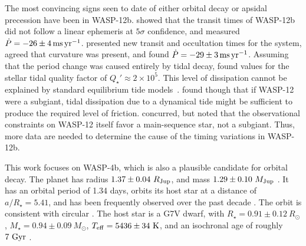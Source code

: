 \documentclass[12pt,twocolumn,tighten]{aastex62}
\begin{document}
The most convincing signs seen to date of either orbital decay or apsidal
precession have been in WASP-12b.
\citet{maciejewski_departure_2016} showed that the transit times of
WASP-12b did not follow a linear ephemeris at $5\sigma$ confidence,
and measured $\dot{P} = -26 \pm 4\,{\rm ms}\,{\rm yr}^{-1}$.
\citet{patra_2017} presented new transit and occultation times for
the system, agreed that curvature was present, and found
$\dot{P} = -29 \pm 3\,{\rm ms}\,{\rm yr}^{-1}$.
Assuming that the period change was caused entirely by tidal decay,
\citet{patra_2017} found values for the stellar tidal quality factor
of $Q_\star' \approx 2\times10^5$.  This level of dissipation cannot be
explained by standard equilibrium tide
models~\citep{penev_tidal_2011,ogilvie_tidal_2014}.
\citet{weinberg_tidal_2017} found though that if WASP-12 were a
subgiant, tidal dissipation due to a dynamical tide might be
sufficient to produce the required level of friction.
\cite{bailey_understanding_2019} concurred, but noted that the
observational constraints on WASP-12 itself favor a main-sequence
star, not a subgiant.  Thus, more data are needed to determine the
cause of the timing variations in WASP-12b.

% 

This work focuses on WASP-4b, which is also a plausible candidate for
orbital decay.  The planet has radius $1.37 \pm 0.04\ R_{\rm Jup}$,
and mass $1.29 \pm 0.10\ M_{\rm Jup}$
\citep{southworth_homogeneous_2011}.  It has an orbital period of 1.34
days, orbits its host star at a distance of $a/R_\star = 5.41$, and
has been frequently observed over the past decade
\citep{wilson_wasp-4b_2008,huitson_gemini_2017}.  The orbit is
consistent with circular \citep[][but see
\S~\ref{sec:apsidal_precession}]{beerer_secondary_2011,husnoo_observational_2012,bonomo_gaps_2017}.
The host star is a G7V dwarf, with $R_\star = 0.91 \pm 0.12\ R_\odot$,
$M_\star = 0.94 \pm 0.09\ M_\odot$, $T_{\rm eff} = 5436 \pm 34\ {\rm
K}$, and an isochronal age of roughly $7\ {\rm Gyr}$
\citep{southworth_homogeneous_2011,petrucci_no_2013}.
\end{document}
